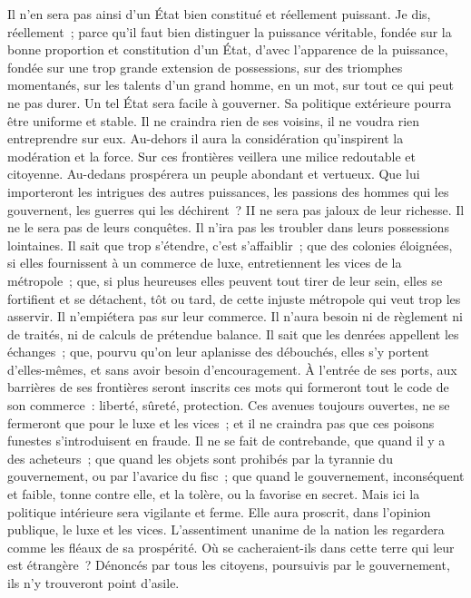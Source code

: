 \documentclass[french,twoside]{book} %
\begin{document}
Il n’en sera pas ainsi d’un État bien constitué et réellement puissant. Je dis, réellement ; parce qu’il faut bien distinguer la puissance véritable, fondée sur la bonne proportion et constitution d’un État, d’avec l’apparence de la puissance, fondée sur une trop grande extension de possessions, sur des triomphes momentanés, sur les talents d’un grand homme, en un mot, sur tout ce qui peut ne pas durer. Un tel État sera facile à gouverner. Sa politique extérieure pourra être uniforme et stable. Il ne craindra rien de ses voisins, il ne voudra rien entreprendre sur eux. Au-dehors il aura la considération qu’inspirent la modération et la force. Sur ces frontières veillera une milice redoutable et citoyenne. Au-dedans prospérera un peuple abondant et vertueux. Que lui importeront les intrigues des autres puissances, les passions des hommes qui les gouvernent, les guerres qui les déchirent ? II ne sera pas jaloux de leur richesse. Il ne le sera pas de leurs conquêtes. Il n’ira pas les troubler dans leurs possessions lointaines. Il sait que trop s’étendre, c’est s’affaiblir ; que des colonies éloignées, si elles fournissent à un commerce de luxe, entretiennent les vices de la métropole ; que, si plus heureuses elles peuvent tout tirer de leur sein, elles se fortifient et se détachent, tôt ou tard, de cette injuste métropole qui veut trop les asservir. Il n’empiétera pas sur leur commerce. Il n’aura besoin ni de règlement ni de traités, ni de calculs de prétendue balance. Il sait que les denrées appellent les échanges ; que, pourvu qu’on leur aplanisse des débouchés, elles s’y portent d’elles-mêmes, et sans avoir besoin d’encouragement. À l’entrée de ses ports, aux barrières de ses frontières seront inscrits ces mots qui formeront tout le code de son commerce : liberté, sûreté, protection. Ces avenues toujours ouvertes, ne se fermeront que pour le luxe et les vices ; et il ne craindra pas que ces poisons funestes s’introduisent en fraude. Il ne se fait de contrebande, que quand il y a des acheteurs ; que quand les objets sont prohibés par la tyrannie du gouvernement, ou par l’avarice du fisc ; que quand le gouvernement, inconséquent et faible, tonne contre elle, et la tolère, ou la favorise en secret. Mais ici la politique intérieure sera vigilante et ferme. Elle aura proscrit, dans l’opinion publique, le luxe et les vices. L’assentiment unanime de la nation les regardera comme les fléaux de sa prospérité. Où se cacheraient-ils dans cette terre qui leur est étrangère ? Dénoncés par tous les citoyens, poursuivis par le gouvernement, ils n’y trouveront point d’asile.\par
\end{document}
